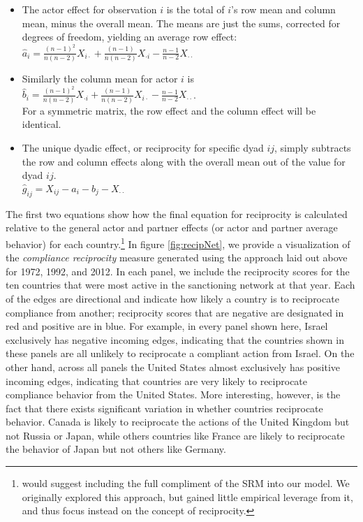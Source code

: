  \begin{itemize}
	 \item The actor effect for observation $i$ is the total of $i$'s row mean and column mean, minus the overall mean.  The means are just the sums, corrected for degrees of freedom, yielding an average row effect:\\
	 $\hat{a}_i = \frac{(n-1)^2}{n(n-2)} X_{i \cdot} + \frac{(n-1)}{n(n-2)} X_{\cdot i} -  \frac{n-1}{n-2} X_{\cdot \cdot} $
	\item Similarly the column mean for actor $i$ is \\
	 $\hat{b}_i = \frac{(n-1)^2}{n(n-2)} X_{\cdot i} + \frac{(n-1)}{n(n-2)} X_{i \cdot } -  \frac{n-1}{n-2} X_{\cdot \cdot} $.\\ For a symmetric matrix, the row effect and the column effect will be identical.
	\item The unique dyadic effect, or reciprocity for specific dyad $ij$, simply subtracts the row and column effects along with the overall mean out of the value for dyad $ij$. \\
	$\hat{g}_{ij} = X_{ij} - \hat{a}_i - \hat{b}_j - X_{\cdot \cdot}$
 \end{itemize}

\doublespacing
The first two equations show how the final equation for reciprocity is calculated relative to the general actor and partner effects (or actor and partner average behavior) for each country.\footnote{\cite{kenny1994interpersonal} would suggest including the full compliment of the SRM into our model. We originally explored this approach, but gained little empirical leverage from it, and thus focus instead on the concept of reciprocity.} In figure \ref{fig:recipNet}, we provide a visualization of the \textit{compliance reciprocity} measure generated using the approach laid out above for 1972, 1992, and 2012. In each panel, we include the reciprocity scores for the ten countries that were most active in the sanctioning network at that year. Each of the edges are directional and indicate how likely a country is to reciprocate compliance from another; reciprocity scores that are negative are designated in red and positive are in blue. For example, in every panel shown here, Israel exclusively has negative incoming edges, indicating that the countries shown in these panels are all unlikely to reciprocate a compliant action from Israel. On the other hand, across all panels the United States almost exclusively has positive incoming edges, indicating that countries are very likely to reciprocate compliance behavior from the United States. More interesting, however, is the fact that there exists significant variation in whether countries reciprocate behavior. Canada is likely to reciprocate the actions of the United Kingdom but not Russia or Japan, while others countries like France are likely to reciprocate the behavior of Japan but not others like Germany.

